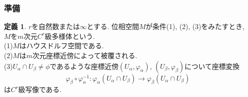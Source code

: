 \documentclass[dvipdfmx,cjk]{beamer}
\theoremstyle{definition}
\newtheorem{dfn}{\textbf{ 定義 }}
\begin{document}


\begin{frame}
  \frametitle{準備} 
  \begin{dfn}
  $r$を自然数または$\infty$とする. 位相空間$M$が条件(1), (2), (3)をみたすとき, 
  $M$を$m$次元$\mathit{C}^r$級多様体という. \\
  (1)$M$はハウスドルフ空間である. \\
  (2)$M$は$m$次元座標近傍によって被覆される. \\
  (3)$U_\alpha \cap U_\beta \neq \phi$であるような座標近傍$(U_\alpha, \varphi_\alpha)$, 
  $(U_\beta, \varphi_\beta)$について座標変換
  $$\varphi_\beta \circ \varphi_\alpha^{-1}: \varphi_\alpha(U_\alpha \cap U_\beta)
  \rightarrow \varphi_\beta(U_\alpha \cap U_\beta)$$
  は$\mathit{C}^r$級写像である. 
  \end{dfn}
  \end{frame}
  
\end{document}
